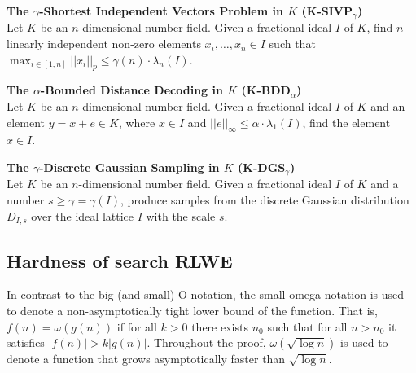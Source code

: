 \documentclass[../main.tex]{subfiles}
\begin{document}
\begin{tcolorbox}
\noindent
\textbf{The $\gamma$-Shortest Independent Vectors Problem in $K$ (K-SIVP$_{\gamma}$)}\\
Let $K$ be an $n$-dimensional number field. Given a fractional ideal $I$ of $K$, find $n$ linearly independent non-zero elements $x_i, \dots, x_n \in I$ such that $\max_{i \in [1,n]} ||x_i||_p \le \gamma(n) \cdot \lambda_n(I)$.
\end{tcolorbox}

\begin{tcolorbox}
\noindent
\textbf{The $\alpha$-Bounded Distance Decoding in $K$ (K-BDD$_{\alpha}$)}\\
Let $K$ be an $n$-dimensional number field. Given a fractional ideal $I$ of $K$ and an element $y =x+e \in K$, where $x \in I$ and $||e||_{\infty} \le \alpha \cdot \lambda_1(I)$, find the element $x \in I$.
\end{tcolorbox}

\begin{tcolorbox}
\noindent
\textbf{The $\gamma$-Discrete Gaussian Sampling in $K$ (K-DGS$_{\gamma}$)}\\
Let $K$ be an $n$-dimensional number field. Given a fractional ideal $I$ of $K$ and a number $s \ge \gamma=\gamma(I)$, produce samples from the discrete Gaussian distribution $D_{I, s}$ over the ideal lattice $I$ with the scale $s$.
\end{tcolorbox}



\subsection{Hardness of search RLWE}


In contrast to the big (and small) O notation, the small omega notation is used to denote a non-asymptotically tight lower bound of the function. That is, $f(n) = \omega(g(n))$ if for all $k>0$ there exists $n_0$ such that for all $n > n_0$ it satisfies $|f(n)|>k|g(n)|$. Throughout the proof, $\omega(\sqrt{\log n})$ is used to denote a function that grows asymptotically faster than  $\sqrt{\log n}$. 
\end{document}
